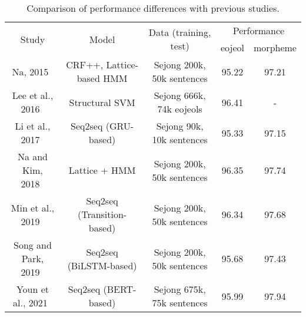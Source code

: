 \documentclass[AMS,STIX2COL]{WileyNJD-v2}
\begin{document}
    \begin{table*}[ht]
        \caption{Comparison of performance differences with previous studies.}
        \label{tab:differences-with-previous-studies}
        \begin{tabular*}{500pt}{@{\extracolsep\fill}ccc|cc@{\extracolsep\fill}}
            \toprule
            \multirow{2}{*}{Study}                & \multirow{2}{*}{Model}                          & \multirow{2}{*}{Data (training, test)}      & \multicolumn{2}{c}{Performance}                           \\
            \cmidrule{4-5}
            ~                                     & ~                                               & ~                                           & \multicolumn{1}{c}{eojeol} & \multicolumn{1}{c}{morpheme} \\
            \midrule
            Na, 2015~\cite{NaSH2015}              & CRF++, Lattice-based HMM                        & Sejong 200k, 50k sentences                  & 95.22                      & 97.21                        \\
            Lee et al., 2016~\cite{LeeCH2016}     & Structural SVM                                  & Sejong 666k, 74k eojeols                    & 96.41                      & -                            \\
            Li et al., 2017~\cite{Li2017}         & Seq2seq (GRU-based)                             & Sejong 90k, 10k sentences                   & 95.33                      & 97.15                        \\
            Na and Kim, 2018~\cite{NaSH2018}      & Lattice + HMM                                   & Sejong 200k, 50k sentences                  & 96.35                      & 97.74                        \\
            Min et al., 2019~\cite{MinJW2019}     & Seq2seq (Transition-based)                      & Sejong 200k, 50k sentences                  & 96.34                      & 97.68                        \\
            Song and Park, 2019~\cite{SongHJ2019} & Seq2seq (BiLSTM-based)                          & Sejong 200k, 50k sentences                  & 95.68                      & 97.43                        \\
            Youn et al., 2021~\cite{YounJY2021}   & Seq2seq (BERT-based)                            & Sejong 675k, 75k sentences                  & 95.99                      & 97.94                        \\

\end{tabular*}
\end{table*}
\end{document}
